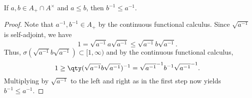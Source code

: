 \begin{proposition}
If $a, b \in A_+ \cap A^\times$ and $a \leq b$, then $b^{-1} \leq a^{-1}$.
\end{proposition}

\begin{proof}
Note that $a^{-1}, b^{-1} \in A_+$ by the continuous functional calculus. Since $\sqrt{a^{-1}}$ is self-adjoint, we have
\begin{equation}
1 = \sqrt{a^{-1}}a \sqrt{a^{-1}} \leq \sqrt{a^{-1}}b\sqrt{a^{-1}}.
\end{equation} 
Thus, $\sigma(\sqrt{a^{-1}}b \sqrt{a^{-1}}) \subset [1, \infty)$ and by the continuous functional calculus,
\begin{equation}
1 \geq \qty(\sqrt{a^{-1}}b\sqrt{a^{-1}})^{-1} = \sqrt{a^{-1}}^{-1} b^{-1} \sqrt{a^{-1}}^{-1}.
\end{equation}
Multiplying by $\sqrt{a^{-1}}$ to the left and right as in the first step now yields $b^{-1} \leq a^{-1}$.
\end{proof}

